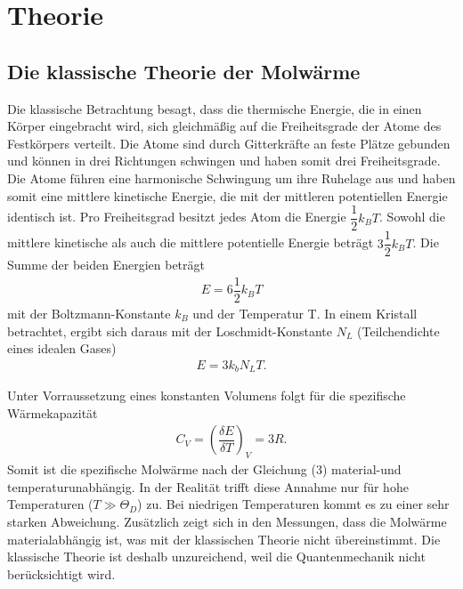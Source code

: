 \documentclass{article}
\begin{document}
 

\section{Theorie} 
\subsection{Die klassische Theorie der Molwärme}
Die klassische Betrachtung besagt, dass die thermische Energie, die in einen Körper eingebracht wird, sich gleichmäßig auf die Freiheitsgrade der Atome des Festkörpers verteilt. Die Atome sind durch Gitterkräfte an feste Plätze gebunden und können in drei Richtungen schwingen und haben somit drei Freiheitsgrade. Die Atome führen eine harmonische Schwingung um ihre Ruhelage aus und haben somit eine mittlere kinetische Energie, die mit der mittleren potentiellen Energie identisch ist. Pro Freiheitsgrad besitzt jedes Atom die Energie $\dfrac{1}{2}k_BT$. Sowohl die mittlere kinetische als auch die mittlere potentielle Energie beträgt $3\dfrac{1}{2}k_BT$. Die Summe der beiden Energien beträgt 
\begin{align}
E=6\dfrac{1}{2}k_BT
\end{align}
mit der Boltzmann-Konstante $k_B$  und der Temperatur T. In einem Kristall betrachtet, ergibt sich daraus mit der Loschmidt-Konstante $N_L$ (Teilchendichte eines idealen Gases)
\begin{align}
E=3k_bN_LT.
\end{align}

Unter Vorraussetzung eines konstanten Volumens folgt für die spezifische Wärmekapazität
\begin{align}
C_V=\left(\dfrac{\delta E}{\delta T}\right)_V=3R.
\end{align}
Somit ist die spezifische Molwärme nach der Gleichung (3) material-und temperaturunabhängig. In der Realität trifft diese Annahme nur für hohe Temperaturen ($T\gg\Theta_D$) zu. Bei niedrigen Temperaturen kommt es zu einer sehr starken Abweichung. Zusätzlich zeigt sich in den Messungen, dass die Molwärme materialabhängig ist, was mit der klassischen Theorie nicht übereinstimmt. Die klassische Theorie ist deshalb unzureichend, weil die Quantenmechanik nicht berücksichtigt wird.
\end{document}
